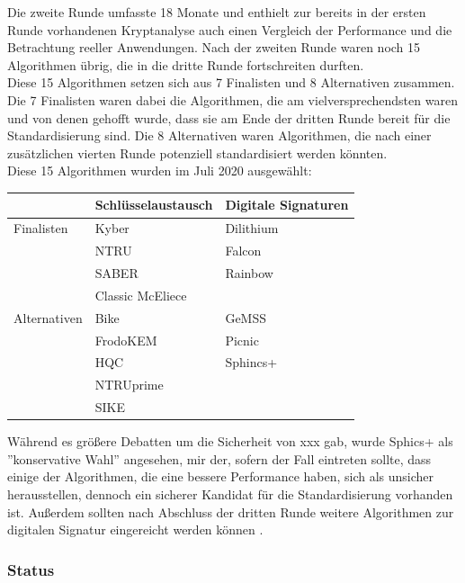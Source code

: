 		Die zweite Runde umfasste 18 Monate und enthielt zur bereits in der ersten Runde 					vorhandenen Kryptanalyse auch einen Vergleich der Performance und die Betrachtung 					reeller Anwendungen. Nach der zweiten Runde waren noch 15 Algorithmen übrig, die in die 			dritte Runde fortschreiten durften.\\
		
		Diese 15 Algorithmen setzen sich aus 7 Finalisten und 8 Alternativen zusammen. Die 7 				Finalisten waren dabei die Algorithmen, die am vielversprechendsten waren und von denen 			gehofft wurde, dass sie am Ende der dritten Runde bereit für die Standardisierung sind. 			Die 8 Alternativen waren Algorithmen, die nach einer zusätzlichen vierten Runde 					potenziell standardisiert werden könnten.\\

		Diese 15 Algorithmen wurden im Juli 2020 ausgewählt:
		\begin{center}
			\begin{tabular}{|l|l|l|}
				\hline	
				& Schlüsselaustausch & Digitale Signaturen \\
				\hline
				Finalisten & Kyber & Dilithium \\
				& NTRU & Falcon \\
				& SABER & Rainbow \\
				& Classic McEliece &  \\
				\hline
				Alternativen & Bike & GeMSS \\
				& FrodoKEM & Picnic \\
				& HQC & Sphincs+ \\
				& NTRUprime & \\
				& SIKE & \\
				\hline
			\end{tabular}
		\end{center}
		
		Während es größere Debatten um die Sicherheit von xxx gab, wurde Sphics+ als 						''konservative Wahl'' \cite{Gorjan2020} angesehen, mir der, sofern der Fall eintreten sollte, 				dass einige der Algorithmen, die eine bessere Performance haben, sich als unsicher 				herausstellen, dennoch ein sicherer Kandidat für die Standardisierung vorhanden ist. 				Außerdem sollten nach Abschluss der dritten Runde weitere Algorithmen zur digitalen 				Signatur eingereicht werden können \cite{Gorjan2020}.

		\subsubsection{Status}		
		\label{subsubsec:grundlagen:pqc:verfahren:status}
	
